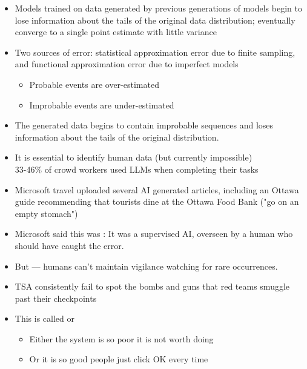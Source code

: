 \documentclass[25pt,a4paper,landscape,headrule,footrule,xetex]{foils}
\begin{document}
\begin{itemize}\addtolength{\itemsep}{-1ex}
\item Models trained on data generated by previous generations of
  models begin to lose information about the tails of the original
  data distribution;  eventually converge to a single point estimate
  with little variance
\item Two sources of error: statistical
  approximation error due to finite sampling, and functional
  approximation error due to imperfect models
  \begin{itemize}
  \item  Probable events are over-estimated 
  \item Improbable events are under-estimated 
  \end{itemize}
\item The generated data begins to contain improbable sequences and
  loses information about the tails of the original distribution.
\item It is essential to identify human data (but currently impossible)
  \\ 33-46\% of crowd workers used LLMs when completing their tasks
\end{itemize}


\begin{itemize}\addtolength{\itemsep}{-1ex}
\item Microsoft travel uploaded several AI generated articles,
  including an Ottawa guide recommending that tourists dine
  at the Ottawa Food Bank ("go on an empty stomach")
\item Microsoft said this was : It was a supervised AI, overseen by a human who should have caught the error.
\item But --- humans can't maintain vigilance watching for rare occurrences.
\item TSA consistently fail to spot the bombs and guns that red teams
   smuggle past their checkpoints
 \item This is called  or 
   \begin{itemize}
   \item Either the system is so poor it is not worth doing
   \item Or it is so good people just click OK every time
   \end{itemize}
 \end{itemize}
\end{document}
